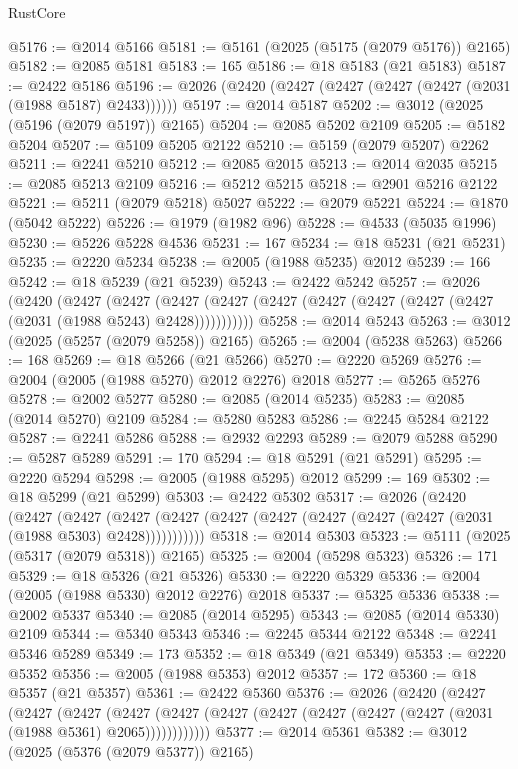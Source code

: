 \begin{lexlean}{RustCore}
\begin{coremodule}
@5176 := @2014 @5166
@5181 := @5161 (@2025 (@5175 (@2079 @5176)) @2165)
@5182 := @2085 @5181
@5183 := 165
@5186 := @18 @5183 (@21 @5183)
@5187 := @2422 @5186
@5196 := @2026 (@2420 (@2427 (@2427 (@2427 (@2427 (@2031 (@1988 @5187) @2433))))))
@5197 := @2014 @5187
@5202 := @3012 (@2025 (@5196 (@2079 @5197)) @2165)
@5204 := @2085 @5202 @2109
@5205 := @5182 @5204
@5207 := @5109 @5205 @2122
@5210 := @5159 (@2079 @5207) @2262
@5211 := @2241 @5210
@5212 := @2085 @2015
@5213 := @2014 @2035
@5215 := @2085 @5213 @2109
@5216 := @5212 @5215
@5218 := @2901 @5216 @2122
@5221 := @5211 (@2079 @5218) @5027
@5222 := @2079 @5221
@5224 := @1870 (@5042 @5222)
@5226 := @1979 (@1982 @96)
@5228 := @4533 (@5035 @1996)
@5230 := @5226 @5228 @4536
@5231 := 167
@5234 := @18 @5231 (@21 @5231)
@5235 := @2220 @5234
@5238 := @2005 (@1988 @5235) @2012
@5239 := 166
@5242 := @18 @5239 (@21 @5239)
@5243 := @2422 @5242
@5257 := @2026
    (@2420
      (@2427
        (@2427
          (@2427 (@2427 (@2427 (@2427 (@2427 (@2427 (@2427 (@2031 (@1988 @5243) @2428)))))))))))
@5258 := @2014 @5243
@5263 := @3012 (@2025 (@5257 (@2079 @5258)) @2165)
@5265 := @2004 (@5238 @5263)
@5266 := 168
@5269 := @18 @5266 (@21 @5266)
@5270 := @2220 @5269
@5276 := @2004 (@2005 (@1988 @5270) @2012 @2276) @2018
@5277 := @5265 @5276
@5278 := @2002 @5277
@5280 := @2085 (@2014 @5235)
@5283 := @2085 (@2014 @5270) @2109
@5284 := @5280 @5283
@5286 := @2245 @5284 @2122
@5287 := @2241 @5286
@5288 := @2932 @2293
@5289 := @2079 @5288
@5290 := @5287 @5289
@5291 := 170
@5294 := @18 @5291 (@21 @5291)
@5295 := @2220 @5294
@5298 := @2005 (@1988 @5295) @2012
@5299 := 169
@5302 := @18 @5299 (@21 @5299)
@5303 := @2422 @5302
@5317 := @2026
    (@2420
      (@2427
        (@2427
          (@2427 (@2427 (@2427 (@2427 (@2427 (@2427 (@2427 (@2031 (@1988 @5303) @2428)))))))))))
@5318 := @2014 @5303
@5323 := @5111 (@2025 (@5317 (@2079 @5318)) @2165)
@5325 := @2004 (@5298 @5323)
@5326 := 171
@5329 := @18 @5326 (@21 @5326)
@5330 := @2220 @5329
@5336 := @2004 (@2005 (@1988 @5330) @2012 @2276) @2018
@5337 := @5325 @5336
@5338 := @2002 @5337
@5340 := @2085 (@2014 @5295)
@5343 := @2085 (@2014 @5330) @2109
@5344 := @5340 @5343
@5346 := @2245 @5344 @2122
@5348 := @2241 @5346 @5289
@5349 := 173
@5352 := @18 @5349 (@21 @5349)
@5353 := @2220 @5352
@5356 := @2005 (@1988 @5353) @2012
@5357 := 172
@5360 := @18 @5357 (@21 @5357)
@5361 := @2422 @5360
@5376 := @2026
    (@2420
      (@2427
        (@2427
          (@2427
            (@2427 (@2427 (@2427 (@2427 (@2427 (@2427 (@2427 (@2031 (@1988 @5361) @2065))))))))))))
@5377 := @2014 @5361
@5382 := @3012 (@2025 (@5376 (@2079 @5377)) @2165)

\end{coremodule}
\end{lexlean}
